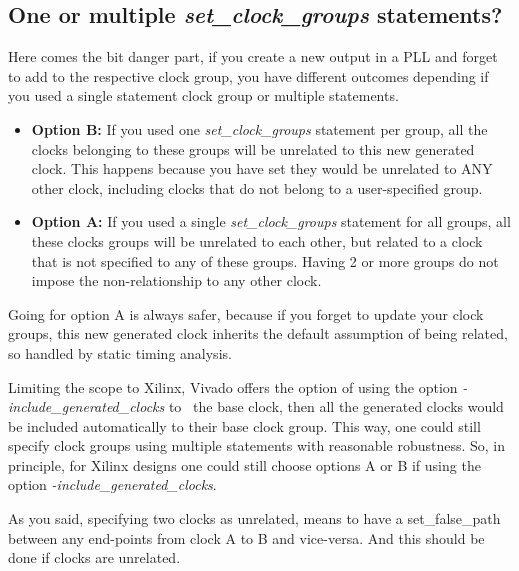 \subsection{One or multiple \textit{set\_clock\_groups} statements?}

Here comes the bit danger part, if you create a new output in a PLL and forget to add to the respective clock group, you have different outcomes depending if you used a single statement clock group or multiple statements. 

 \begin{itemize}
     \item \textbf{Option B:} If you used one \textit{set\_clock\_groups} statement per group, all the clocks belonging to these groups will be unrelated to this new generated clock. This happens because you have set they would be unrelated to ANY other clock, including clocks that do not belong to a user-specified group. 
     \item \textbf{Option A:} If you used a single \textit{set\_clock\_groups} statement for all groups, all these clocks groups will be unrelated to each other, but related to a clock that is not specified to any of these groups. Having 2 or more groups do not impose the non-relationship to any other clock. 
 \end{itemize}

Going for option A is always safer, because if you forget to update your clock groups, this new generated clock inherits the default assumption of being related, so handled by static timing analysis. 

Limiting the scope to Xilinx, Vivado offers the option of using the option \textit{-include\_generated\_clocks} to~ the base clock,  then all the generated clocks would be included automatically to their base clock group. 
This way, one could still specify clock groups using multiple statements with reasonable robustness. So, in principle, for Xilinx designs one could still choose options A or B if using the option \textit{-include\_generated\_clocks}.

As you said, specifying two clocks as unrelated, means to have a set\_false\_path between any end-points from clock A to B and vice-versa. And this should be done if clocks are unrelated. 